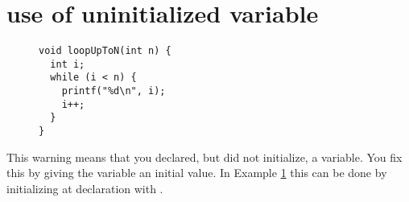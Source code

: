 \section{use of uninitialized variable}\label{sec:uninit-var}

\begin{figure}
\begin{lstlisting}
void loopUpToN(int n) {
  int i;
  while (i < n) {
    printf("%d\n", i);
    i++;
  }
}
\end{lstlisting}

\label{ex:uninit-var}
\end{figure}

This warning means that you declared, but did not initialize, a variable.
You fix this by giving the variable an initial value.
In Example \ref{ex:uninit-var} this can be done by initializing at declaration with .

\newpage
